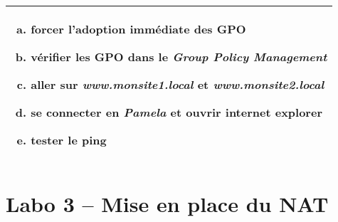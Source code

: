 \documentclass[a4paper]{article}
\begin{document}
\begin{center}
\begin{tabular}{|p{7.5cm}|p{7.5cm}|}
        \\ \hline

        \multicolumn{2}{|p{15cm}|}{
            \begin{enumerate}[(a)]
                \item forcer l'adoption immédiate des GPO
                \item vérifier les GPO dans le \textit{Group Policy Management}
                \item aller sur \textit{www.monsite1.local} et \textit{www.monsite2.local}
                \item se connecter en \textit{Pamela} et ouvrir internet explorer
                \item tester le ping
            \end{enumerate}
        }

        \\ \hline

    \end{tabular}
\end{center}















\section{Labo 3 -- Mise en place du NAT}
\end{document}
